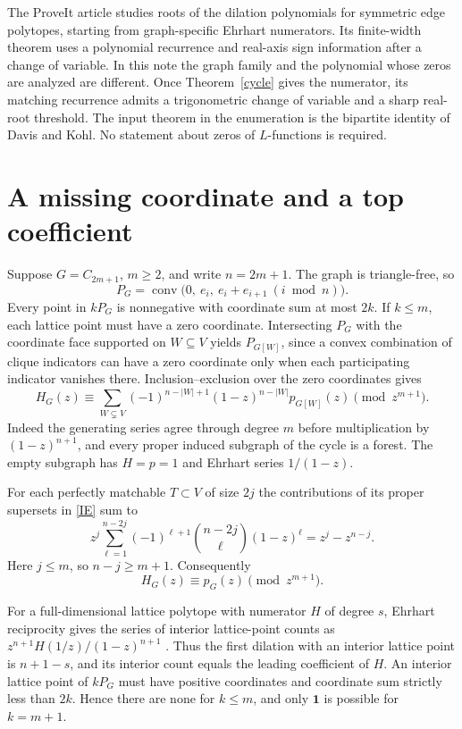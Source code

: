 \documentclass[11pt]{article}
\DeclareMathOperator{\conv}{conv}
\newcommand{\one}{\mathbf1}
\begin{document}
The ProveIt article \cite{Repo} studies roots of the dilation polynomials for symmetric edge polytopes, starting from graph-specific Ehrhart numerators. Its finite-width theorem uses a polynomial recurrence and real-axis sign information after a change of variable. In this note the graph family and the polynomial whose zeros are analyzed are different. Once Theorem~\ref{cycle} gives the numerator, its matching recurrence admits a trigonometric change of variable and a sharp real-root threshold. The input theorem in the enumeration is the bipartite identity of Davis and Kohl. No statement about zeros of $L$-functions is required.

\section{A missing coordinate and a top coefficient}
Suppose $G=C_{2m+1}$, $m\ge2$, and write $n=2m+1$. The graph is triangle-free, so
\[
 P_G=\conv\bigl(0,\ e_i,\ e_i+e_{i+1}\ (i\bmod n)\bigr).
\]
Every point in $kP_G$ is nonnegative with coordinate sum at most $2k$. If $k\le m$, each lattice point must have a zero coordinate. Intersecting $P_G$ with the coordinate face supported on $W\subseteq V$ yields $P_{G[W]}$, since a convex combination of clique indicators can have a zero coordinate only when each participating indicator vanishes there. Inclusion--exclusion over the zero coordinates gives
\begin{equation}\label{IE}
 H_G(z)\equiv\sum_{W\subsetneq V}(-1)^{n-|W|+1}(1-z)^{n-|W|}p_{G[W]}(z)
 \pmod{z^{m+1}} .
\end{equation}
Indeed the generating series agree through degree $m$ before multiplication by $(1-z)^{n+1}$, and every proper induced subgraph of the cycle is a forest. The empty subgraph has $H=p=1$ and Ehrhart series $1/(1-z)$.

For each perfectly matchable $T\subset V$ of size $2j$ the contributions of its proper supersets in \eqref{IE} sum to
\[
 z^j\sum_{\ell=1}^{n-2j}(-1)^{\ell+1}\binom{n-2j}{\ell}(1-z)^\ell
 = z^j-z^{n-j}.
\]
Here $j\le m$, so $n-j\ge m+1$. Consequently
\begin{equation}\label{low}
 H_G(z)\equiv p_G(z)\pmod{z^{m+1}} .
\end{equation}

For a full-dimensional lattice polytope with numerator $H$ of degree $s$, Ehrhart reciprocity gives the series of interior lattice-point counts as $z^{n+1}H(1/z)/(1-z)^{n+1}$ \cite{BR}. Thus the first dilation with an interior lattice point is $n+1-s$, and its interior count equals the leading coefficient of $H$. An interior lattice point of $kP_G$ must have positive coordinates and coordinate sum strictly less than $2k$. Hence there are none for $k\le m$, and only $\one$ is possible for $k=m+1$.
\end{document}
